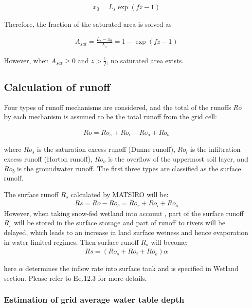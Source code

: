 \begin{eqnarray}
x_0 = L_s \exp(f\overline{z}-1)
\label{eq275}
\end{eqnarray}

Therefore, the fraction of the saturated area is solved as

\begin{eqnarray}
A_{sat} = \frac{L_s - x_0}{L_s} = 1 - \exp(f\overline{z}-1) \label{eq276}
\end{eqnarray}

However, when \(A_{sat} \geq 0\) and \(\overline{z} > \frac1f\), no saturated area exists.

\subsection{Calculation of runoff}\label{calculation-of-runoff}

Four types of runoff mechanisms are considered, and the total of the runoffs \(Ro\) by each mechanism is assumed to be the total runoff from the grid cell:

\begin{eqnarray}
Ro = Ro_s + Ro_i + Ro_o + Ro_b
\label{eq277}
\end{eqnarray}

where \(Ro_s\) is the saturation excess runoff (Dunne runoff), \(Ro_i\) is the infiltration excess runoff (Horton runoff), \(Ro_o\) is the overflow of the uppermost soil layer, and \(Ro_b\) is the
groundwater runoff. The first three types are classified as the surface runoff.

The surface runoff \(R_s\) calculated by MATSIRO will be: \begin{eqnarray}
Rs=Ro-Ro_b=Ro_s + Ro_i + Ro_o
 \label{eq289}
\end{eqnarray} However, when taking snow-fed wetland into account \citep{Nitta2017-hz}, part of the surface runoff \(R_s\) will be stored in the surface storage and part of runoff to rivers will be delayed, which
leads to an increase in land surface wetness and hence evaporation in water-limited regimes. Then surface runoff \(R_s\) will become: \begin{eqnarray}
Rs=(Ro_s + Ro_i + Ro_o)\alpha
 \label{eq290}
\end{eqnarray}

here \(\alpha\) determines the inflow rate into surface tank and is specified in Wetland section. Please refer to Eq.12.3 for more details.

\subsubsection{Estimation of grid average water table depth}\label{estimation-of-grid-average-water-table-depth}

